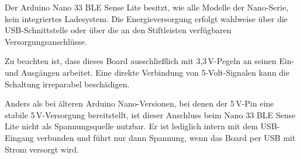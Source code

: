 Der Arduino Nano 33 BLE Sense Lite besitzt, wie alle Modelle der Nano-Serie, kein integriertes Ladesystem. Die Energieversorgung erfolgt wahlweise über die USB-Schnittstelle oder über die an den Stiftleisten verfügbaren Versorgungsanschlüsse.\cite{Arduino:2021}

Zu beachten ist, dass dieses Board ausschließlich mit 3,3\,V-Pegeln an seinen Ein- und Ausgängen arbeitet. Eine direkte Verbindung von 5-Volt-Signalen kann die Schaltung irreparabel beschädigen.\cite{Arduino:2021} 

Anders als bei älteren Arduino Nano-Versionen, bei denen der 5\,V-Pin eine stabile 5\,V-Versorgung bereitstellt, ist dieser Anschluss beim Nano 33 BLE Sense Lite nicht als Spannungsquelle nutzbar. Er ist lediglich intern mit dem USB-Eingang verbunden und führt nur dann Spannung, wenn das Board per USB mit Strom versorgt wird.\cite{Arduino:2021}

